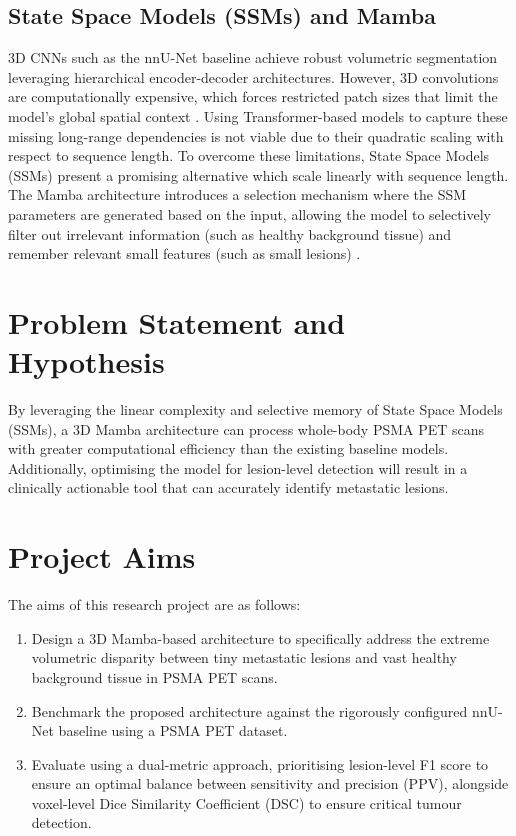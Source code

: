 \documentclass{article}
\begin{document}
\subsection{State Space Models (SSMs) and Mamba}
3D CNNs such as the nnU-Net baseline achieve robust volumetric segmentation leveraging hierarchical encoder-decoder architectures. 
However, 3D convolutions are computationally expensive, which forces restricted patch sizes that limit the model's global spatial 
context \cite{isensee2021nnu}. Using Transformer-based models to capture these missing long-range dependencies is not viable due to 
their quadratic scaling with respect to sequence length. To overcome these limitations, State Space Models (SSMs) present a promising
alternative which scale linearly with sequence length. The Mamba architecture introduces a selection mechanism where the SSM parameters
are generated based on the input, allowing the model to selectively filter out irrelevant information (such as healthy background tissue) 
and remember relevant small features (such as small lesions) \cite{gu2023mamba}.

\section{Problem Statement and Hypothesis}
By leveraging the linear complexity and selective memory of State Space Models (SSMs), a 3D Mamba
architecture can process whole-body PSMA PET scans with greater computational efficiency than the 
existing baseline models. Additionally, optimising the model for lesion-level detection will result in
a clinically actionable tool that can accurately identify metastatic lesions. 

\section{Project Aims}
The aims of this research project are as follows:

\begin{enumerate}
    \item Design a 3D Mamba-based architecture to specifically address the extreme volumetric disparity
    between tiny metastatic lesions and vast healthy background tissue in PSMA PET scans.
    \item Benchmark the proposed architecture against the rigorously configured nnU-Net baseline using 
    a PSMA PET dataset. 
    \item Evaluate using a dual-metric approach, prioritising lesion-level F1 score to ensure an optimal
    balance between sensitivity and precision (PPV), alongside voxel-level Dice Similarity Coefficient (DSC) 
    to ensure critical tumour detection.   
\end{enumerate}
\end{document}
